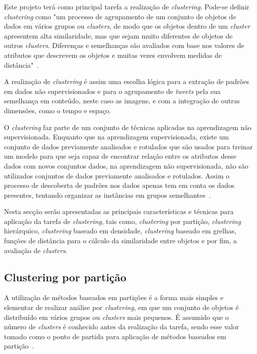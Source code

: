Este projeto terá como principal tarefa a realização de \textit{clustering}. Pode-se definir \textit{clustering} como "um processo de agrupamento de um conjunto de objetos de dados em vários grupos ou \textit{clusters}, de modo que os objetos dentro de um \textit{cluster} apresentem alta similaridade, mas que sejam muito diferentes de objetos de outros \textit{clusters}. Diferenças e semelhanças são avaliados com base nos valores de atributos que descrevem os objetos e muitas vezes envolvem medidas de distância"~\citet{Han2006}.

A realização de \textit{clustering} é assim uma escolha lógica para a extração de padrões em dados não supervisionados e para o agrupamento de \textit{tweets} pela sua semelhança em conteúdo, neste caso as imagens, e com a integração de outras dimensões, como o tempo e espaço.

O \textit{clustering} faz parte de um conjunto de técnicas aplicadas na aprendizagem não supervisionada. Enquanto que na aprendizagem supervisionada, existe um conjunto de dados previamente analisados e rotulados que são usados para treinar um modelo para que seja capaz de encontrar relação entre os atributos desse dados com novos conjuntos dados, na aprendizagem não supervisionada, não são utilizados conjuntos de dados previamente analisados e rotulados. Assim o processo de descoberta de padrões nos dados apenas tem em conta os dados presentes, tentando organizar as instâncias em grupos semelhantes~\citet{Liu2011}.

Nesta secção serão apresentadas as principais características e técnicas para aplicação da tarefa de \textit{clustering}, tais como, \textit{clustering} por partição, \textit{clustering} hierárquico, \textit{clustering} baseado em densidade, \textit{clustering} baseado em grelhas, funções de distância para o cálculo da similaridade entre objetos e por fim, a avaliação de \textit{clusters}.


\subsection{Clustering por partição} \label{subsec:parti}

A utilização de métodos baseados em partições é a forma mais simples e elementar de realizar análise por \textit{clustering}, em que um conjunto de objetos é distribuído em vários grupos ou \textit{clusters} mais pequenos. É assumido que o número de \textit{clusters} é conhecido antes da realização da tarefa, sendo esse valor tomado como o ponto de partida para aplicação de métodos baseados em partição~\citet{Han2006}. 

